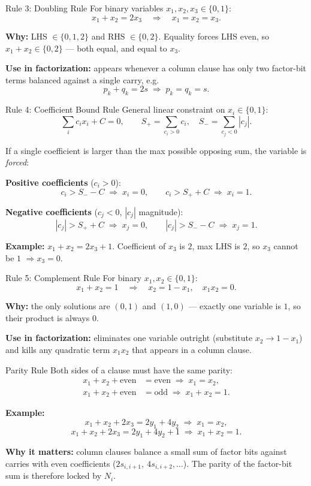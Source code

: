 \documentclass[9pt]{beamer}
\begin{document}
\begin{frame}{Rule 3: Doubling Rule}
For binary variables $x_1, x_2, x_3 \in \{0,1\}$:
\[
x_1 + x_2 = 2 x_3 \quad\Longrightarrow\quad x_1 = x_2 = x_3.
\]

\textbf{Why:} LHS $\in \{0,1,2\}$ and RHS $\in \{0,2\}$. Equality forces LHS even, so $x_1+x_2 \in \{0,2\}$ — both equal, and equal to $x_3$.

\medskip
\textbf{Use in factorization:} appears whenever a column clause has only two factor-bit terms balanced against a single carry, e.g.
\[
p_k + q_k = 2 s \;\Rightarrow\; p_k = q_k = s.
\]
\end{frame}

\begin{frame}{Rule 4: Coefficient Bound Rule}
General linear constraint on $x_i \in \{0,1\}$:
\[
\sum_i c_i x_i + C = 0,\qquad
S_+ \!=\! \sum_{c_i>0} c_i,\quad S_- \!=\! \sum_{c_j<0} |c_j|.
\]

If a single coefficient is larger than the max possible opposing sum, the variable is \emph{forced}:

\smallskip
\textbf{Positive coefficients} ($c_i > 0$):
\[
c_i > S_- - C \;\Rightarrow\; x_i = 0,\qquad
c_i > S_+ + C \;\Rightarrow\; x_i = 1.
\]

\textbf{Negative coefficients} ($c_j < 0$, $|c_j|$ magnitude):
\[
|c_j| > S_+ + C \;\Rightarrow\; x_j = 0,\qquad
|c_j| > S_- - C \;\Rightarrow\; x_j = 1.
\]

\textbf{Example:} $x_1 + x_2 = 2x_3 + 1$. Coefficient of $x_3$ is $2$, max LHS is $2$, so $x_3$ cannot be $1$ $\Rightarrow x_3 = 0$.
\end{frame}

\begin{frame}{Rule 5: Complement Rule}
For binary $x_1, x_2 \in \{0,1\}$:
\[
x_1 + x_2 = 1 \quad\Longrightarrow\quad x_2 = 1 - x_1, \quad x_1 x_2 = 0.
\]

\textbf{Why:} the only solutions are $(0,1)$ and $(1,0)$ — exactly one variable is $1$, so their product is always $0$.

\medskip
\textbf{Use in factorization:} eliminates one variable outright (substitute $x_2 \to 1-x_1$) and kills any quadratic term $x_1 x_2$ that appears in a column clause.
\end{frame}

\begin{frame}{Parity Rule}
Both sides of a clause must have the same parity:
\begin{align*}
x_1 + x_2 + \text{even} &= \text{even} \;\Rightarrow\; x_1 = x_2, \\[3pt]
x_1 + x_2 + \text{even} &= \text{odd}  \;\Rightarrow\; x_1 + x_2 = 1.
\end{align*}

\textbf{Example:}
\[
x_1 + x_2 + 2x_3 = 2y_1 + 4y_2 \;\Rightarrow\; x_1 = x_2,
\]
\[
x_1 + x_2 + 2x_3 = 2y_1 + 4y_2 + 1 \;\Rightarrow\; x_1 + x_2 = 1.
\]

\medskip
\textbf{Why it matters:} column clauses balance a small sum of factor bits against carries with even coefficients ($2 s_{i,i+1},\ 4 s_{i,i+2},\dots$). The parity of the factor-bit sum is therefore locked by $N_i$.
\end{frame}
\end{document}

